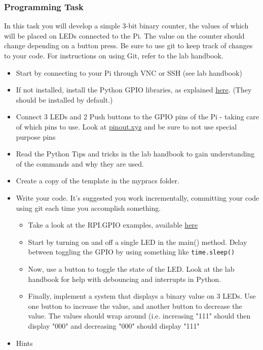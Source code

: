 \subsubsection{Programming Task}
In this task you will develop a simple 3-bit binary counter, the values of which will be placed on LEDs connected to the Pi. The value on the counter should change depending on a button press.
Be sure to use git to keep track of changes to your code. For instructions on using Git, refer to the lab handbook.
\begin{itemize}
\itemsep0em 
    \item Start by connecting to your Pi through VNC or SSH (see lab handbook)
    \item If not installed, install the Python GPIO libraries, as explained \href{https://pythonhosted.org/RPIO/}{here}. (They should be installed by default.)
    \item Connect 3 LEDs and 2 Push buttons to the GPIO pins of the Pi - taking care of which pins to use. Look at \href{pinout.xyz}{pinout.xyz} and be sure to not use special purpose pins
    \item Read the Python Tips and tricks in the lab handbook to gain understanding of the commands and why they are used.
    \item Create a copy of the template in the mypracs folder.
    \item Write your code. It's suggested you work incrementally, committing your code using git each time you accomplish something. 
    \begin{itemize}
    \itemsep0em 
        \item Take a look at the RPI.GPIO examples, available \href{https://sourceforge.net/p/raspberry-gpio-python/wiki/Examples/}{here}
        \item Start by turning on and off a single LED in the main() method. Delay between toggling the GPIO by using something like \verb|time.sleep()|
        \item Now, use a button to toggle the state of the LED. Look at the lab handbook for help with debouncing and interrupts in Python.
        \item Finally, implement a system that displays a binary value on 3 LEDs. Use one button to increase the value, and another button to decrease the value. The values should wrap around (i.e. increasing "111" should then display "000" and decreasing "000" should display "111"
    \end{itemize}
    \item Hints

\end{itemize}
